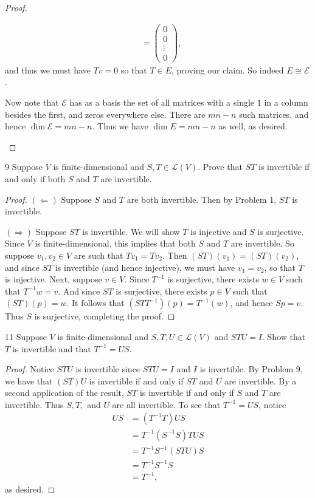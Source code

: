 \documentclass{extarticle}
\newenvironment{problem}[1]{\begin{prob*}{#1}{}}{\end{prob*}}
\newcommand{\Hom}{\mathcal{L}}
\begin{document}
\begin{proof}
\begin{enumerate}[(a)]
\begin{align*}
&= \begin{pmatrix}0\\ 0\\ \vdots\\ 0\end{pmatrix},
\end{align*}
and thus we must have $Tv = 0$ so that $T\in E$, proving our claim.  So indeed $E\cong \mathcal{E}$.  
\par Now note that $\mathcal{E}$ has as a basis the set of all matrices with a single $1$ in a column besides the first, and zeros everywhere else.  There are $mn - n$ such matrices, and hence $\dim \mathcal{E} = mn - n$.  Thus we have $\dim E = mn - n$ as well, as desired.  \qedhere
\end{enumerate}
\end{proof}

\begin{problem}{9}
Suppose $V$ is finite-dimensional and $S,T\in\Hom(V)$.  Prove that $ST$ is invertible if and only if both $S$ and $T$ are invertible.  
\end{problem}
\begin{proof}
$(\Leftarrow)$  Suppose $S$ and $T$ are both invertible.  Then by Problem 1, $ST$ is invertible.
\par $(\Rightarrow)$  Suppose $ST$ is invertible.  We will show $T$ is injective and $S$ is surjective.  Since $V$ is finite-dimensional, this implies that both $S$ and $T$ are invertible.  So suppose $v_1,v_2\in V$ are such that $Tv_1 = Tv_2$.  Then $(ST)(v_1) = (ST)(v_2)$, and since $ST$ is invertible (and hence injective), we must have $v_1 = v_2$, so that $T$ is injective.  Next, suppose $v\in V$.  Since $T^{-1}$ is surjective, there exists $w\in V$ such that $T^{-1}w = v$.  And since $ST$ is surjective, there exists $p\in V$ such that $(ST)(p) = w$.  It follows that $(STT^{-1})(p) = T^{-1}(w)$, and hence $Sp = v$.  Thus $S$ is surjective, completing the proof.
\end{proof}

\begin{problem}{11}
Suppose $V$ is finite-dimensional and $S,T,U\in\Hom(V)$ and $STU = I$.  Show that $T$ is invertible and that $T^{-1}=US$.
\end{problem}
\begin{proof}
Notice $STU$ is invertible since $STU=I$ and $I$ is invertible.  By Problem 9, we have that $(ST)U$ is invertible if and only if $ST$ and $U$ are invertible.  By a second application of the result, $ST$ is invertible if and only if $S$ and $T$ are invertible.  Thus $S,T,$ and $U$ are all invertible.  To see that $T^{-1}=US$, notice
\begin{align*}
US &= (T^{-1}T)US\\
&= T^{-1}(S^{-1}S)TUS\\
&= T^{-1}S^{-1}(STU)S\\
&= T^{-1}S^{-1}S\\
&= T^{-1},
\end{align*}
as desired.
\end{proof}
\end{document}
